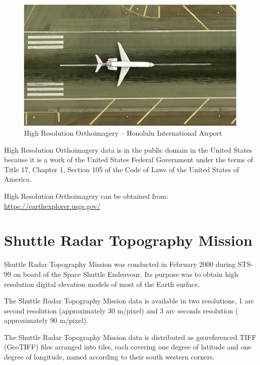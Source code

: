 \begin{figure}[h!]
  \centering
  \includegraphics[width=120mm]{images/usgs_hro_honolulu_intl.eps}
  \caption{High Resolution Orthoimagery -- Honolulu International Airport}
\end{figure}

High Resolution Orthoimagery data is in the public domain in the United States because it is a work of the United States Federal Government under the terms of Title 17, Chapter 1, Section 105 of the Code of Laws of the United States of America.

High Resolution Orthoimagery can be obtained from: \cite{Terrain-EarthExplorer} \\
\url{https://earthexplorer.usgs.gov/}

\section{Shuttle Radar Topography Mission}

Shuttle Radar Topography Mission was conducted in February 2000 during STS-99 on board of the Space Shuttle Endeavour. Its purpose was to obtain high resolution digital elevation models of most of the Earth surface.

The Shuttle Radar Topography Mission data is available in two resolutions, 1 arc second resolution (approximately 30 m/pixel) and 3 arc seconds  resolution ( approximately 90 m/pixel).

The Shuttle Radar Topography Mission data is distributed as georeferenced TIFF (GeoTIFF) files arranged into tiles, each covering one degree of latitude and one degree of longitude, named according to their south western corners.


